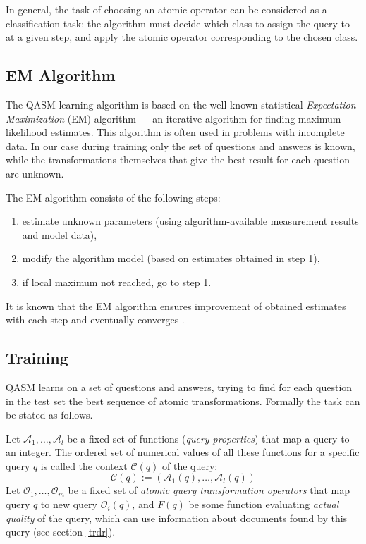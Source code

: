 \documentclass{article}
\begin{document}
In general, the task of choosing an atomic operator can be considered as a
classification task: the algorithm must decide which class to assign the query to
at a given step, and apply the atomic operator corresponding to
the chosen class.

\subsection{EM Algorithm}

The QASM learning algorithm is based on the well-known statistical {\em Expectation Maximization}
(EM) algorithm --- an iterative algorithm for finding maximum likelihood estimates.
This algorithm is often used in problems with incomplete data. In our
case during training only the set of questions and answers is known, while the
transformations themselves that give the best result for each question are
unknown.

The EM algorithm consists of the following steps:
\begin{enumerate}
\item estimate unknown parameters (using algorithm-available measurement results and model data),
\item modify the algorithm model (based on estimates obtained in step 1),
\item if local maximum not reached, go to step 1.
\end{enumerate}

It is known that the EM algorithm ensures improvement of obtained estimates
with each step and eventually converges \cite{dempster:em}.

\subsection{Training}\label{qasm:learning}

QASM learns on a set of questions and answers,
trying to find for each question in the test set the best sequence of
atomic transformations. Formally the task can be stated as follows.

Let $\mathcal{A}_1,\ldots, \mathcal{A}_l$ be a fixed set of
functions ({\em query properties}) that map a query to an integer.
The ordered set of numerical values of all these functions for a specific
query $q$ is called the context $\mathcal{C}(q)$ of the query:
$$\mathcal{C}(q):=(\mathcal{A}_1(q),\ldots,\mathcal{A}_l(q))$$
Let $\mathcal{O}_1,\ldots, \mathcal{O}_m$ be
a fixed set of {\em atomic query transformation operators}
that map query $q$ to new query $\mathcal{O}_i(q)$,
and $F(q)$ be some function evaluating {\em actual quality} of the query, which can
use information about documents found by this query (see section \ref{trdr}).
\end{document}
